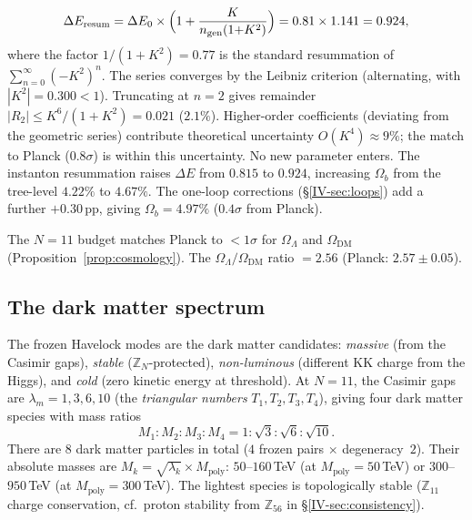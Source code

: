 \begin{proposition}[Cosmological energy budget at $N = 11$]
\begin{equation}
  \Delta E_{\mathrm{resum}}
  = \Delta E_0 \times
    \Bigl(1 + \frac{K}{n_{\mathrm{gen}}(1{+}K^2)}\Bigr)
  = 0.81 \times 1.141 = 0.924,
\end{equation}
where the factor $1/(1{+}K^2) = 0.77$ is the standard
resummation of $\sum_{n=0}^\infty (-K^2)^n$.
The series converges by the Leibniz criterion
(alternating, with $|K^2| = 0.300 < 1$).
Truncating at $n = 2$ gives remainder
$|R_2| \le K^6/(1{+}K^2) = 0.021$ ($2.1\%$).
Higher-order coefficients (deviating from the geometric
series) contribute theoretical uncertainty
$O(K^4) \approx 9\%$; the match to Planck
($0.8\sigma$) is within this uncertainty.
No new parameter enters.
The instanton resummation raises $\Delta E$ from
$0.815$ to $0.924$, increasing $\Omega_b$ from the
tree-level $4.22\%$ to $4.67\%$.
The one-loop corrections (\S\ref*{IV-sec:loops})
add a further $+0.30$\,pp, giving
$\Omega_b = 4.97\%$ ($0.4\sigma$ from Planck).
\end{proposition}

The $N = 11$ budget matches Planck \citep{Planck2018} to $< 1\sigma$ for
$\Omega_\Lambda$ and $\Omega_{\mathrm{DM}}$
(Proposition~\ref{prop:cosmology}).
The $\Omega_\Lambda / \Omega_{\mathrm{DM}}$ ratio $= 2.56$
(Planck: $2.57 \pm 0.05$).

\subsection{The dark matter spectrum}

The frozen Havelock modes are the dark matter candidates:
\emph{massive} (from the Casimir gaps), \emph{stable}
($\mathbb{Z}_N$-protected), \emph{non-luminous} (different
KK charge from the Higgs), and \emph{cold} (zero kinetic energy
at threshold).
At $N = 11$, the Casimir gaps are $\lambda_m = 1, 3, 6, 10$
(the \emph{triangular numbers} $T_1, T_2, T_3, T_4$),
giving four dark matter species with mass ratios
\begin{equation}\label{eq:dm-masses}
  M_1 : M_2 : M_3 : M_4
  = 1 : \sqrt{3} : \sqrt{6} : \sqrt{10}.
\end{equation}
There are $8$ dark matter particles in total
($4$ frozen pairs $\times$ degeneracy~$2$).
Their absolute masses are $M_k = \sqrt{\lambda_k} \times M_{\mathrm{poly}}$:
$50$--$160$\,TeV (at $M_{\mathrm{poly}} = 50$\,TeV) or
$300$--$950$\,TeV (at $M_{\mathrm{poly}} = 300$\,TeV).
The lightest species is topologically stable
($\mathbb{Z}_{11}$ charge conservation, cf.\ proton stability
from $\mathbb{Z}_{56}$ in \S\ref*{IV-sec:consistency}).


